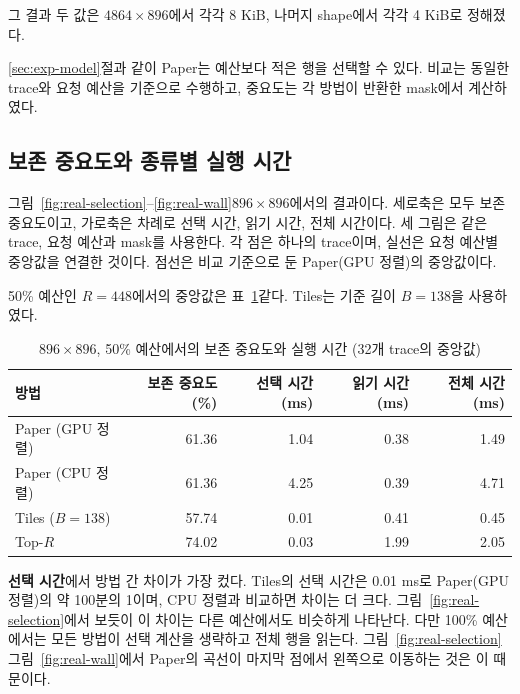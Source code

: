 그 결과 두 값은 $4864\times896$에서 각각 8 KiB, 나머지 shape에서 각각 4 KiB로 정해졌다.

\ref{sec:exp-model}절과 같이 Paper는 예산보다 적은 행을 선택할 수 있다. 비교는 동일한 trace와 요청 예산을 기준으로 수행하고, 중요도는 각 방법이 반환한 mask에서 계산하였다.

\subsection{보존 중요도와 종류별 실행 시간}\label{sec:exp-real-results}

그림~\ref{fig:real-selection}--\ref{fig:real-wall}\은 $896\times896$에서의 결과이다. 세로축은 모두 보존 중요도이고, 가로축은 차례로 선택 시간, 읽기 시간, 전체 시간이다. 세 그림은 같은 trace, 요청 예산과 mask를 사용한다. 각 점은 하나의 trace이며, 실선은 요청 예산별 중앙값을 연결한 것이다. 점선은 비교 기준으로 둔 Paper(GPU 정렬)의 중앙값이다.

50\% 예산인 $R=448$에서의 중앙값은 표~\ref{tab:real-50}\와 같다. Tiles는 기준 길이 $B=138$을 사용하였다.

\begin{table}[htbp]
    \centering
    \caption{$896\times896$, 50\% 예산에서의 보존 중요도와 실행 시간 (32개 trace의 중앙값)}
    \label{tab:real-50}
    \setlength{\tabcolsep}{5pt}
    \begin{tabular}{lrrrr}
        \toprule
        방법 & 보존 중요도 (\%) & 선택 시간 (ms) & 읽기 시간 (ms) & 전체 시간 (ms) \\
        \midrule
        Paper (GPU 정렬) & 61.36 & 1.04 & 0.38 & 1.49 \\
        Paper (CPU 정렬) & 61.36 & 4.25 & 0.39 & 4.71 \\
        Tiles ($B=138$) & 57.74 & 0.01 & 0.41 & 0.45 \\
        Top-$R$ & 74.02 & 0.03 & 1.99 & 2.05 \\
        \bottomrule
    \end{tabular}
\end{table}

\textbf{선택 시간}에서 방법 간 차이가 가장 컸다. Tiles의 선택 시간은 0.01 ms로 Paper(GPU 정렬)의 약 100분의 1이며, CPU 정렬과 비교하면 차이는 더 크다. 그림~\ref{fig:real-selection}에서 보듯이 이 차이는 다른 예산에서도 비슷하게 나타난다. 다만 100\% 예산에서는 모든 방법이 선택 계산을 생략하고 전체 행을 읽는다. 그림~\ref{fig:real-selection}\와 그림~\ref{fig:real-wall}에서 Paper의 곡선이 마지막 점에서 왼쪽으로 이동하는 것은 이 때문이다.

